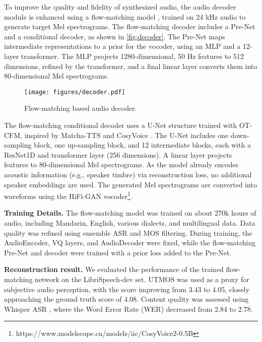 To improve the quality and fidelity of synthesized audio, the audio decoder module is enhanced using a flow-matching model \cite{lipman2022flow}, trained on 24 kHz audio to generate target Mel spectrograms. The flow-matching decoder includes a Pre-Net and a conditional decoder, as shown in \autoref{fig:decoder}. The Pre-Net maps intermediate representations to a prior for the vocoder, using an MLP and a 12-layer transformer. The MLP projects 1280-dimensional, 50 Hz features to 512 dimensions, refined by the transformer, and a final linear layer converts them into 80-dimensional Mel spectrograms. 
\begin{wrapfigure}{r}{0.4\textwidth}
  \centering
  \texttt{[image: figures/decoder.pdf]}
  \caption{Flow-matching based audio decoder.}
  \label{fig:decoder}
\end{wrapfigure}
The flow-matching conditional decoder uses a U-Net structure trained with OT-CFM, inspired by Matcha-TTS \cite{mehta2024matcha} and CosyVoice \cite{du2024cosyvoice}. The U-Net includes one down-sampling block, one up-sampling block, and 12 intermediate blocks, each with a ResNet1D and transformer layer (256 dimensions). A linear layer projects features to 80-dimensional Mel spectrograms. As the model already encodes acoustic information (e.g., speaker timbre) via reconstruction loss, no additional speaker embeddings are used. The generated Mel spectrograms are converted into waveforms using the HiFi-GAN \cite{kong2020hifi,du2024cosyvoice} vocoder\footnote{https://www.modelscope.cn/models/iic/CosyVoice2-0.5B}.

\textbf{Training Details.}
The flow-matching model was trained on about 270k hours of audio, including Mandarin, English, various dialects, and multilingual data. Data quality was refined using ensemble ASR and MOS filtering. During training, the AudioEncoder, VQ layers, and AudioDecoder were fixed, while the flow-matching Pre-Net and decoder were trained with a prior loss added to the Pre-Net.

\textbf{Reconstruction result.}
We evaluated the performance of the trained flow-matching network on the LibriSpeech-dev set. UTMOS \cite{saeki2022utmos} was used as a proxy for subjective audio perception, with the score improving from 3.43 to 4.05, closely approaching the ground truth score of 4.08. Content quality was assessed using Whisper ASR \cite{radford2023robust}, where the Word Error Rate (WER) decreased from 2.84 to 2.78. 



